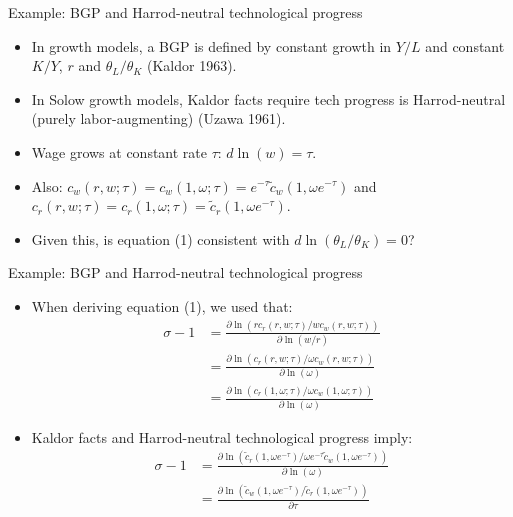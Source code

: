 \documentclass[notes=show]{beamer}
\begin{document}
\begin{frame}{Example: BGP and Harrod-neutral technological progress}
\begin{itemize}
\item In growth models, a BGP is defined by constant growth in $Y/L$ and constant $K/Y$, $r$ and $ \theta_{L}/\theta_{K}$ (Kaldor 1963). \medskip  
\item In Solow growth models, Kaldor facts require tech progress is Harrod-neutral (purely labor-augmenting) (Uzawa 1961). \medskip
\item Wage grows at constant rate $ \tau $: $ d \ln(w) = \tau $. \medskip
\item Also: $ c_{w}(r,w; \tau) = c_{w} (1, \omega; \tau) = e^{-\tau} \tilde{c}_{w} (1, \omega e^{-\tau}) $ and  $ c_{r}(r,w; \tau) = c_{r} (1, \omega; \tau) = \tilde{c}_{r} (1, \omega e^{-\tau}) $. \medskip
\item Given this, is equation (1) consistent with $ d \ln( \theta_{L} / \theta_{K})=0 $?
\end{itemize}
\end{frame}

\begin{frame}{Example: BGP and Harrod-neutral technological progress}
\begin{itemize}
\item When deriving equation (1), we used that:
\begin{align*}
    \sigma - 1 & = \frac{\partial \ln(rc_{r}(r,w;\tau) / wc_{w}(r,w;\tau))}{\partial \ln(w / r )} \\
    & = \frac{\partial \ln(c_{r}(r,w;\tau) / \omega c_{w}(r,w;\tau))}{\partial \ln(\omega)} \\
    & = \frac{\partial \ln(c_{r}(1,\omega;\tau) / \omega c_{w}(1, \omega;\tau))}{\partial \ln(\omega)}
\end{align*}
\item Kaldor facts and Harrod-neutral technological progress imply:
\begin{align*}
    \sigma - 1 & = \frac{\partial \ln(\tilde{c}_{r}(1,\omega e^{-\tau}) / \omega e^{-\tau} \tilde{c}_{w}(1, \omega e^{-\tau}))}{\partial \ln(\omega)}  \\
    & = \frac{\partial \ln(\tilde{c}_{w}(1,\omega e^{-\tau}) / \tilde{c}_{r}(1, \omega e^{-\tau}))}{\partial \tau} 
\end{align*}
\end{itemize}
\end{frame}
\end{document}
